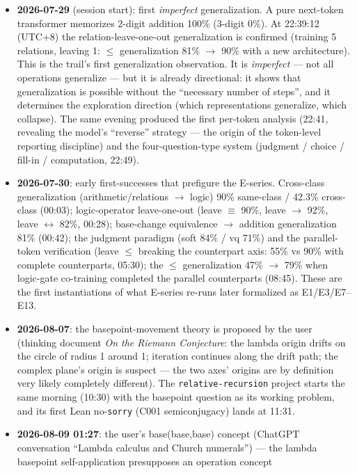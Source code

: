\documentclass[sigplan,10pt,anonymous,review]{acmart}
\begin{document}
\begin{itemize}
\item \textbf{2026-07-29} (session start): first \emph{imperfect}
generalization. A pure next-token transformer memorizes 2-digit addition
100\% (3-digit 0\%). At 22:39:12 (UTC+8) the relation-leave-one-out
generalization is confirmed (training 5 relations, leaving 1: $\le$
generalization 81\% $\to$ 90\% with a new architecture). This is the trail's
first generalization observation. It is \emph{imperfect} --- not all
operations generalize --- but it is already directional: it shows that
generalization is possible without the ``necessary number of steps'', and it
determines the exploration direction (which representations generalize, which
collapse). The same evening produced the first per-token analysis (22:41,
revealing the model's ``reverse'' strategy --- the origin of the token-level
reporting discipline) and the four-question-type system (judgment /
choice / fill-in / computation, 22:49).
\item \textbf{2026-07-30}: early first-successes that prefigure the E-series.
  Cross-class generalization (arithmetic/relations $\to$ logic) 90\% same-class
  / 42.3\% cross-class (00:03); logic-operator leave-one-out (leave $\equiv$
  90\%, leave $\to$ 92\%, leave $\leftrightarrow$ 82\%, 00:28); base-change
  equivalence $\to$ addition generalization 81\% (00:42); the judgment
  paradigm (soft 84\% / vq 71\%) and the parallel-token verification (leave
  $\le$ breaking the counterpart axis: 55\% vs 90\% with complete counterparts,
  05:30); the $\le$ generalization 47\% $\to$ 79\% when logic-gate co-training
  completed the parallel counterparts (08:45). These are the first
  instantiations of what E-series re-runs later formalized as E1/E3/E7--E13.
\item \textbf{2026-08-07}: the basepoint-movement theory is proposed by the
user (thinking document \emph{On the Riemann Conjecture}: the lambda
origin drifts on the circle of radius 1 around 1; iteration continues
along the drift path; the complex plane's origin is suspect --- the two
axes' origins are by definition very likely completely different). The
\texttt{relative-recursion} project starts the same morning (10:30) with
the basepoint question as its working problem, and its first Lean
no-\texttt{sorry} (C001 semiconjugacy) lands at 11:31.
\item \textbf{2026-08-09 01:27}: the user's base(base,base) concept
(ChatGPT conversation ``Lambda calculus and Church numerals'') --- the
lambda basepoint self-application presupposes an operation concept

\end{itemize}
\end{document}
